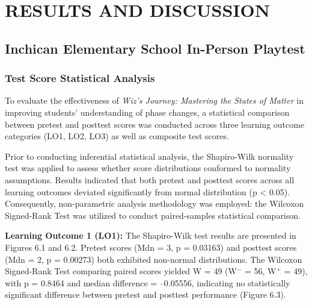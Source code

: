 \chapter{RESULTS AND DISCUSSION}

\section{Inchican Elementary School In-Person Playtest}

\subsection{Test Score Statistical Analysis}

To evaluate the effectiveness of \textit{Wiz's Journey: Mastering the States of Matter} in improving students' understanding of phase changes, a statistical comparison between pretest and posttest scores was conducted across three learning outcome categories (LO1, LO2, LO3) as well as composite test scores.

Prior to conducting inferential statistical analysis, the Shapiro-Wilk normality test was applied to assess whether score distributions conformed to normality assumptions. Results indicated that both pretest and posttest scores across all learning outcomes deviated significantly from normal distribution (p < 0.05). Consequently, non-parametric analysis methodology was employed: the Wilcoxon Signed-Rank Test was utilized to conduct paired-samples statistical comparison.

\textbf{Learning Outcome 1 (LO1):} The Shapiro-Wilk test results are presented in Figures 6.1 and 6.2. Pretest scores (Mdn = 3, p = 0.03163) and posttest scores (Mdn = 2, p = 0.00273) both exhibited non-normal distributions. The Wilcoxon Signed-Rank Test comparing paired scores yielded W = 49 (W$^{-}$ = 56, W$^{+}$ = 49), with p = 0.8464 and median difference = --0.05556, indicating no statistically significant difference between pretest and posttest performance (Figure 6.3).

